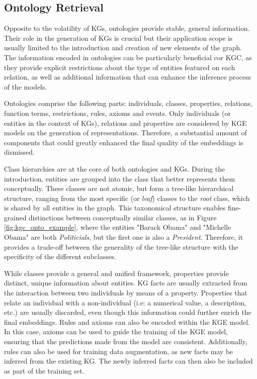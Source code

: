 \subsection{Ontology Retrieval}
Opposite to the volatility of KGs, ontologies provide stable, general information. Their role in the generation of KGs is crucial but their application scope is usually limited to the introduction and creation of new elements of the graph. The information encoded in ontologies can be particularly beneficial cor KGC, as they provide explicit restrictions about the type of entities featured on each relation, as well as additional information that can enhance the inference process of the models.

Ontologies comprise the following parts: individuals, classes, properties, relations, function terms, restrictions, rules, axioms and events. Only individuals (or entities in the context of KGs), relations and properties are considered by KGE models on the generation of representations. Therefore, a substantial amount of components that could greatly enhanced the final quality of the embeddings is dismissed.

Class hierarchies are at the core of both ontologies and KGs. During the introduction, entities are grouped into the class that better represents them conceptually. These classes are not atomic, but form a tree-like hierarchical structure, ranging from the most specific (or \textit{leaf}) classes to the \textit{root} class, which is shared by all entities in the graph. This taxonomical structure enables fine-grained distinctions between conceptually similar classes, as in Figure \ref{fig:kgc_onto_example}, where the entities "Barack Obama" and "Michelle Obama" are both \textit{Politicials}, but the first one is also a \textit{President}. Therefore, it provides a trade-off between the generality of the tree-like structure with the specificity of the different subclasses. 

While classes provide a general and unified framework, properties provide distinct, unique information about entities. KG facts are usually extracted from the interaction between two individuals by means of a property. Properties that relate an individual with a non-individual (i.e: a numerical value, a description, etc.) are usually discarded, even though this information could further enrich the final embeddings. Rules and axioms can also be encoded within the KGE model. In this case, axioms can be used to guide the training of the KGE model, ensuring that the predictions made from the model are consistent. Additionally, rules can also be used for training data augmentation, as new facts may be inferred from the existing KG. The newly inferred facts can then also be included as part of the training set.

